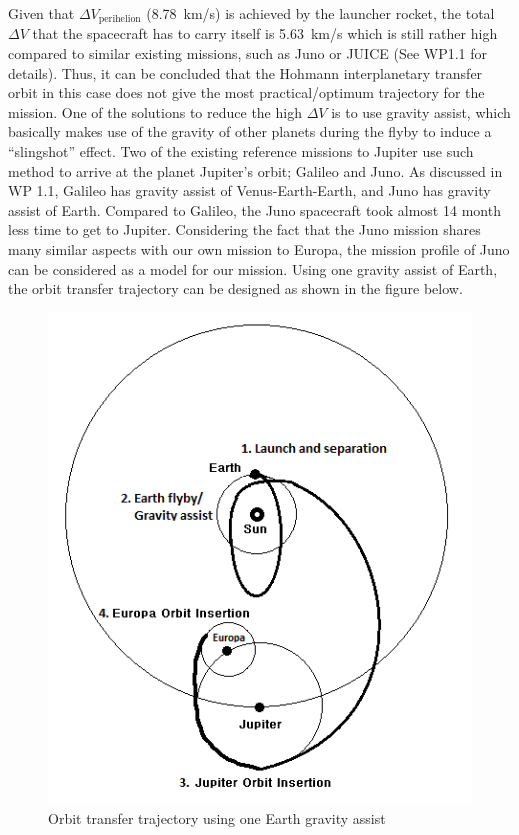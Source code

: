 Given that $\Delta V_\mathrm{perihelion}$ (\SI{8.78}{km/s}) is achieved
by the launcher rocket, the total $\Delta V$ that the spacecraft has
to carry itself is \SI{5.63}{km/s} which is still rather high compared
to similar existing missions, such as Juno or JUICE (See WP1.1 for
details).  Thus, it can be concluded that the Hohmann interplanetary
transfer orbit in this case does not give the most practical/optimum
trajectory for the mission.  One of the solutions to reduce the high
$\Delta V$ is to use gravity assist, which basically makes use of the
gravity of other planets during the flyby to induce a “slingshot”
effect.  Two of the existing reference missions to Jupiter use such
method to arrive at the planet Jupiter’s orbit; Galileo and Juno.  As
discussed in WP 1.1, Galileo has gravity assist of Venus-Earth-Earth,
and Juno has gravity assist of Earth.  Compared to Galileo, the Juno
spacecraft took almost 14 month less time to get to
Jupiter.\cite{SolarSystemNasa} Considering the fact that the Juno
mission shares many similar aspects with our own mission to Europa,
the mission profile of Juno can be considered as a model for our
mission.  Using one gravity assist of Earth, the orbit transfer
trajectory can be designed as shown in the figure below.

\begin{figure}[H]
  \includegraphics[width=\textwidth]{Transfer-Orbits}
  \caption{Orbit transfer trajectory using one Earth gravity assist}
\end{figure}

